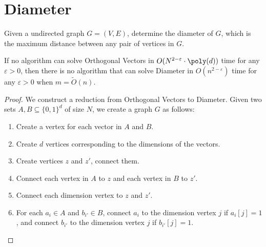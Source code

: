 \section{Diameter}

\begin{problem}[Diameter]
Given a undirected graph $G = (V, E)$, determine the diameter of $G$, which is the maximum distance between any pair of vertices in $G$.
\end{problem}
\begin{theorem}
	If no algorithm can solve Orthogonal Vectors in $O(N^{2-\varepsilon} \cdot \poly(d))$ time for any $\varepsilon > 0$, then there is no algorithm that can solve Diameter in $O(n^{2-\varepsilon})$ time for any $\varepsilon > 0$ when $m=\tilde{O}(n)$.
\end{theorem}
\begin{proof}
	We construct a reduction from Orthogonal Vectors to Diameter. Given two sets $A, B \subseteq \{0, 1\}^d$ of size $N$, we create a graph $G$ as follows:
	\begin{enumerate}
		\item Create a vertex for each vector in $A$ and $B$.
		\item Create $d$ vertices corresponding to the dimensions of the vectors.
		\item Create vertices $z$ and $z'$, connect them.
		\item Connect each vertex in $A$ to $z$ and each vertex in $B$ to $z'$.
		\item Connect each dimension vertex to $z$ and $z'$.
		\item For each $a_i \in A$ and $b_{i'} \in B$, connect $a_i$ to the dimension vertex $j$ if $a_i[j] = 1$, and connect $b_{i'}$ to the dimension vertex $j$ if $b_{i'}[j] = 1$.
	\end{enumerate}
	\begin{center}
\end{center}
\end{proof}
